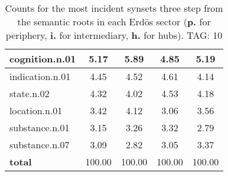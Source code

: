 \begin{table}[h!]
\begin{center}
\begin{tabular}{| l || c | c | c | c |}
cognition.n.01 & 5.17  & 5.89  & 4.85  & 5.19 \\\hline
indication.n.01 & 4.45  & 4.52  & 4.61  & 4.14 \\\hline
state.n.02 & 4.32  & 4.02  & 4.53  & 4.18 \\\hline
location.n.01 & 3.42  & 4.12  & 3.06  & 3.56 \\\hline
substance.n.01 & 3.15  & 3.26  & 3.32  & 2.79 \\\hline
substance.n.07 & 3.09  & 2.82  & 3.05  & 3.37 \\\hline\hline
{{\bf total}} & 100.00  & 100.00  & 100.00  & 100.00 \\\hline
\end{tabular}
\caption{Counts for the most incident synsets three step from the semantic roots in each Erd\"os sector ({\bf p.} for periphery, {\bf i.} for intermediary, {\bf h.} for hubs). TAG: 10}
\end{center}
\end{table}